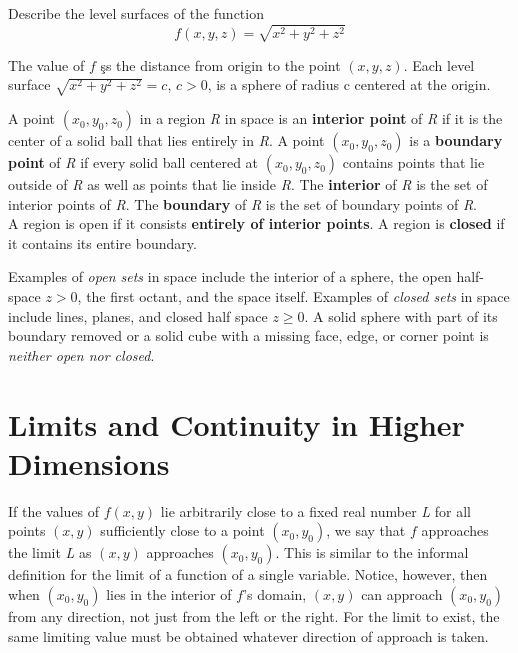 \documentclass[12pt,a4paper,draft]{article}
\newenvironment{definition}{\begin{definitionbox}}{\end{definitionbox}\vspace{1\baselineskip}}
\begin{document}
\begin{example}
Describe the level surfaces of the function
\[f(x,y,z)=\sqrt{x^{2}+y^{2}+z^{2}}\]
\end{example}

\begin{solution}
    The value of \(f\) şs the distance from origin to the point \((x,y,z)\). 
    Each level surface \(\sqrt{x^{2}+y^{2}+z^{2}} = c\), \(c>0\), is a sphere of radius c centered at the origin.
\end{solution}

\begin{definition}
    A point \((x_0,y_0,z_0)\) in a region \textit{R} in space is an \textbf{interior point} of \textit{R} if it is the center of a solid ball that lies entirely in \textit{R}. 
    A point \((x_0,y_0,z_0)\) is a \textbf{boundary point} of \textit{R} if every solid ball centered at \((x_0,y_0,z_0)\) contains points that lie outside of \textit{R} as well as points that lie inside \textit{R}.
    The \textbf{interior} of \textit{R} is the set of interior points of \textit{R}. The \textbf{boundary} of \textit{R} is the set of boundary points of \textit{R}.\\
    A region is open if it consists \textbf{entirely of interior points}. A region is \textbf{closed} if it contains its entire boundary.

\end{definition}

Examples of \textit{open sets} in space include the interior of a sphere, the open half-space \(z > 0\), the first octant, and the space itself. 
Examples of \textit{closed sets} in space include lines, planes, and closed half space \(z \geq 0\). A solid sphere with part of its boundary removed or a solid cube with a missing face, edge, or corner point is \textit{neither open nor closed}.

\newpage 

\section{Limits and Continuity in Higher Dimensions}

If the values of \(f(x,y)\) lie arbitrarily close to a fixed real number \textit{L} for all points \((x,y)\) sufficiently close to a point \((x_0,y_0)\), we say that \(f\) approaches the limit \textit{L} as \((x,y)\) approaches \((x_0,y_0)\).
This is similar to the informal definition for the limit of a function of a single variable. Notice, however, then when \((x_0,y_0)\) lies in the interior of \(f\)'s domain, \((x,y)\) can approach \((x_0,y_0)\) from any direction, not just from the left or the right. For the limit to exist, the same limiting value must be obtained whatever direction of approach is taken.
\end{document}
